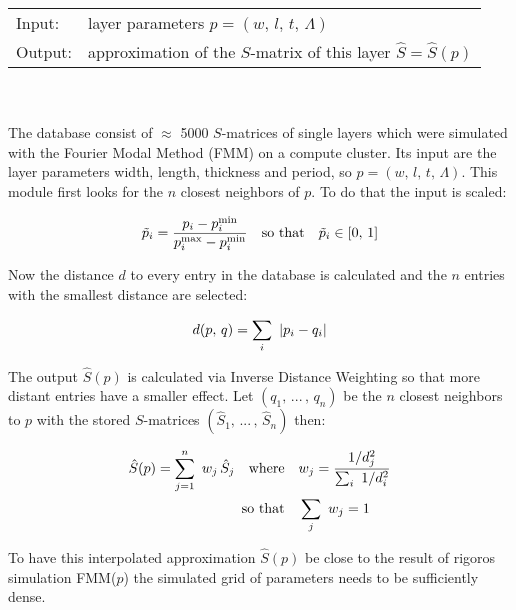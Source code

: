 \begin{tabular}{ll}
    \toprule
    Input: & layer parameters $p = (w, \, l, \, t, \, \Lambda)$ \\
    Output: & approximation of the $S$-matrix of this layer $\hat{S} = \hat{S}(p)$\\
    \bottomrule
\end{tabular}
\\
\\
The database consist of $\approx$ 5000 $S$-matrices of single layers which were simulated with the Fourier Modal Method (FMM) on a compute cluster. Its input are the layer parameters width, length, thickness and period, so $p = (w, \, l, \, t, \, \Lambda)$. This module first looks for the $n$ closest neighbors of $p$. To do that the input is scaled:

\begin{equation}
    \tilde{p}_i = \frac{p_i - p_i^\s{min}}{p_i^\s{max} - p_i^\s{min}}
    \qq{so that} \tilde{p}_i \in [0, \, 1]
\end{equation}

\noindent
Now the distance $d$ to every entry in the database is calculated and the $n$ entries with the smallest distance are selected:

\begin{equation}
    d(p, \,q) = \sum_i \ \qty|p_i - q_i|
\end{equation}

\noindent
The output $\hat{S}(p)$ is calculated via Inverse Distance Weighting \cite{Shepard1968} so that more distant entries have a smaller effect. Let
$(q_1, \, ... \, , \, q_n)$ be the $n$ closest neighbors to $p$ with the stored $S$-matrices
$(\hat{S}_1, \, ... \, , \, \hat{S}_n)$
then:

\begin{equation}
\begin{aligned}
    \hat{S}(p) = \sum_{j=1}^n \ w_j \, \hat{S}_j
    \qq{where}& w_j = \frac{1 / d_j^2}{\sum_i \ 1 / d^2_i} \\
    \qq*{so that} &\sum_j \ w_j = 1
\end{aligned}
\end{equation}

\noindent
To have this interpolated approximation $\hat{S}(p)$ be close to the result of rigoros simulation FMM($p$) the simulated grid of parameters needs to be sufficiently dense. 
